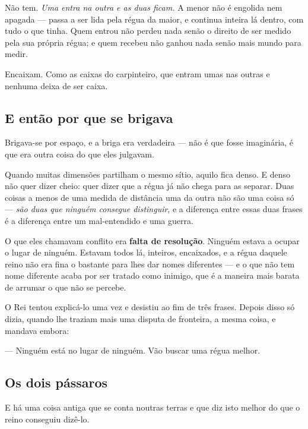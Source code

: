 \documentclass[livro.tex]{subfiles}
\begin{document}
\medskip

Não tem. \emph{Uma entra na outra e as duas ficam.} A menor não é engolida nem apagada --- passa a
ser lida pela régua da maior, e continua inteira lá dentro, com tudo o que tinha. Quem entrou não
perdeu nada senão o direito de ser medido pela sua própria régua; e quem recebeu não ganhou nada
senão mais mundo para medir.

\medskip

Encaixam. Como as caixas do carpinteiro, que entram umas nas outras e nenhuma deixa de ser caixa.

\subsection*{E então por que se brigava}

Brigava-se por espaço, e a briga era verdadeira --- não é que fosse imaginária, é que era outra
coisa do que eles julgavam.

\medskip

Quando muitas dimensões partilham o mesmo sítio, aquilo fica denso. E denso não quer dizer cheio:
quer dizer que a régua já não chega para as separar. Duas coisas a menos de uma medida de
distância uma da outra não são uma coisa só --- \emph{são duas que ninguém consegue distinguir},
e a diferença entre essas duas frases é a diferença entre um mal-entendido e uma guerra.

\medskip

O que eles chamavam conflito era \textbf{falta de resolução}. Ninguém estava a ocupar o lugar de
ninguém. Estavam todos lá, inteiros, encaixados, e a régua daquele reino não era fina o bastante
para lhes dar nomes diferentes --- e o que não tem nome diferente acaba por ser tratado como
inimigo, que é a maneira mais barata de arrumar o que não se percebe.

\medskip

O Rei tentou explicá-lo uma vez e desistiu ao fim de três frases. Depois disso só dizia, quando
lhe traziam mais uma disputa de fronteira, a mesma coisa, e mandava embora:

\medskip

--- Ninguém está no lugar de ninguém. Vão buscar uma régua melhor.


\subsection*{Os dois pássaros}

E há uma coisa antiga que se conta noutras terras e que diz isto melhor do que o reino conseguiu
dizê-lo.
\end{document}
